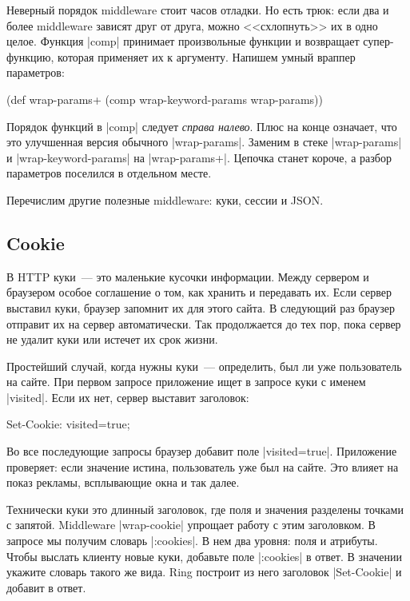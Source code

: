 Неверный порядок middleware стоит часов отладки. Но есть трюк: если два и более
middleware зависят друг от друга, можно <<схлопнуть>> их в одно целое. Функция
\spverb|comp| принимает произвольные функции и возвращает супер-функцию, которая
применяет их к аргументу. Напишем умный враппер параметров:

\begin{english}
  \begin{clojure}
(def wrap-params+ (comp wrap-keyword-params wrap-params))
  \end{clojure}
\end{english}

Порядок функций в \spverb|comp| следует \emph{справа налево}. Плюс на конце
означает, что это улучшенная версия обычного \spverb|wrap-params|. Заменим в
стеке \spverb|wrap-params| и \spverb|wrap-keyword-params| на
\spverb|wrap-params+|. Цепочка станет короче, а разбор параметров поселился в
отдельном месте.

Перечислим другие полезные middleware: куки, сессии и JSON.


\subsection{Cookie}

В HTTP куки~--- это маленькие кусочки информации. Между сервером и браузером
особое соглашение о том, как хранить и передавать их. Если сервер выставил куки,
браузер запомнит их для этого сайта. В следующий раз браузер отправит их на
сервер автоматически. Так продолжается до тех пор, пока сервер не удалит куки
или истечет их срок жизни.

Простейший случай, когда нужны куки~--- определить, был ли уже пользователь на
сайте. При первом запросе приложение ищет в запросе куки с именем
\spverb|visited|. Если их нет, сервер выставит заголовок:

\begin{english}
  \begin{http}
Set-Cookie: visited=true;
  \end{http}
\end{english}

Во все последующие запросы браузер добавит поле \spverb|visited=true|.
Приложение проверяет: если значение истина, пользователь уже был на сайте.
Это влияет на показ рекламы, всплывающие окна и так далее.

Технически куки это длинный заголовок, где поля и значения разделены точками с
запятой. Middleware \spverb|wrap-cookie| упрощает работу с этим заголовком. В
запросе мы получим словарь \spverb|:cookies|. В нем два уровня: поля и
атрибуты. Чтобы выслать клиенту новые куки, добавьте поле \spverb|:cookies| в
ответ. В значении укажите словарь такого же вида. Ring построит из него
заголовок \spverb|Set-Cookie| и добавит в ответ.

